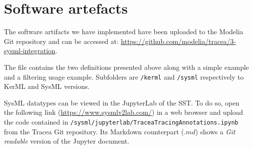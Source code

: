 \section{Software artefacts}\label{sec:artefacts}
The software artifacts we have implemented have been uploaded to the Modelia Git repository and can be accessed at:
\url{https://github.com/modelia/tracea/3-sysml-integration}.

The file contains the two definitions presented above along with a simple example and a filtering usage example. Subfolders are \verb|/kerml| and \verb|/sysml| respectively to KerML and SysML versions.

SysML datatypes can be viewed in the JupyterLab of the SST. To do so, open the following link (\url{https://www.sysmlv2lab.com/}) in a web browser  and upload the code contained in \verb|/sysml/jupyterlab/TraceaTracingAnnotations.ipynb| from the Tracea Git repository. Its Markdown counterpart ($.md$) shows a \textit{Git readable} version of the Jupyter document.